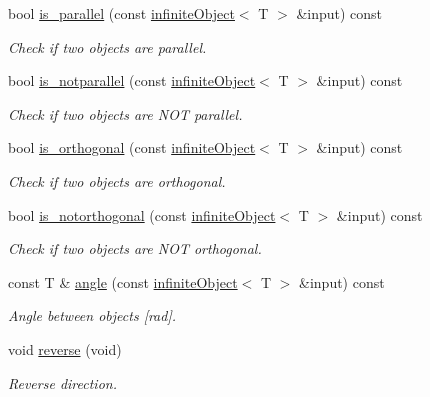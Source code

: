\begin{DoxyCompactItemize}
bool \hyperlink{classddd_1_1infinite_object_a52c16b849e5bd987c69ed6ae79a6cab1}{is\+\_\+parallel} (const \hyperlink{classddd_1_1infinite_object}{infinite\+Object}$<$ T $>$ \&input) const
\begin{DoxyCompactList}\small\item\em Check if two objects are parallel. \end{DoxyCompactList}\item 
bool \hyperlink{classddd_1_1infinite_object_ad4f312a6d767c5825632d8915a9f7dbc}{is\+\_\+notparallel} (const \hyperlink{classddd_1_1infinite_object}{infinite\+Object}$<$ T $>$ \&input) const
\begin{DoxyCompactList}\small\item\em Check if two objects are N\+OT parallel. \end{DoxyCompactList}\item 
bool \hyperlink{classddd_1_1infinite_object_a634f0db3a5447756901c43f8f3d20a8a}{is\+\_\+orthogonal} (const \hyperlink{classddd_1_1infinite_object}{infinite\+Object}$<$ T $>$ \&input) const
\begin{DoxyCompactList}\small\item\em Check if two objects are orthogonal. \end{DoxyCompactList}\item 
bool \hyperlink{classddd_1_1infinite_object_a1dbf3e37dc6f146f089c4c63c4704329}{is\+\_\+notorthogonal} (const \hyperlink{classddd_1_1infinite_object}{infinite\+Object}$<$ T $>$ \&input) const
\begin{DoxyCompactList}\small\item\em Check if two objects are N\+OT orthogonal. \end{DoxyCompactList}\item 
const T \& \hyperlink{classddd_1_1infinite_object_a2145eca21c4505c11d19badc25faaf85}{angle} (const \hyperlink{classddd_1_1infinite_object}{infinite\+Object}$<$ T $>$ \&input) const
\begin{DoxyCompactList}\small\item\em Angle between objects \mbox{[}rad\mbox{]}. \end{DoxyCompactList}\item 
\mbox{\label{classddd_1_1infinite_object_ae9f9826fd760a02b74604e63434b4211}} 
void \hyperlink{classddd_1_1infinite_object_ae9f9826fd760a02b74604e63434b4211}{reverse} (void)
\begin{DoxyCompactList}\small\item\em Reverse direction. \end{DoxyCompactList}\end{DoxyCompactItemize}
